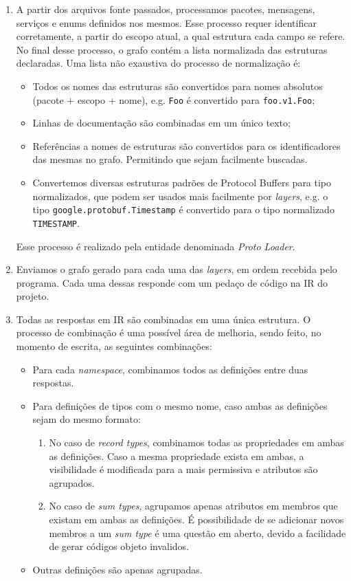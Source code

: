 \begin{enumerate}
\item A partir dos arquivos fonte passados, processamos pacotes, mensagens, serviços e enums
  definidos nos mesmos. Esse processo requer identificar corretamente, a partir do escopo atual,
  a qual estrutura cada campo se refere. No final desse processo, o grafo contém a lista
  normalizada das estruturas declaradas. Uma lista não exaustiva do processo de normalização é:

  \begin{itemize}
  \item Todos os nomes das estruturas são convertidos para nomes absolutos (pacote + escopo + nome),
    e.g. \texttt{Foo} é convertido para \texttt{foo.v1.Foo};
  \item Linhas de documentação são combinadas em um único texto;
  \item Referências a nomes de estruturas são convertidos para os identificadores das mesmas no
    grafo. Permitindo que sejam facilmente buscadas.
  \item Convertemos diversas estruturas padrões de Protocol Buffers para tipo normalizados, que
    podem ser usados mais facilmente por \textit{layers}, e.g. o tipo \texttt{google.protobuf.Timestamp}
    é convertido para o tipo normalizado \texttt{TIMESTAMP}.
  \end{itemize}

  Esse processo é realizado pela entidade denominada \textit{Proto Loader}.
\item Enviamos o grafo gerado para cada uma das \textit{layers}, em ordem recebida pelo programa.
  Cada uma dessas responde com um pedaço de código na IR do projeto.
\item Todas as respostas em IR são combinadas em uma única estrutura. O processo de combinação é
  uma possível área de melhoria, sendo feito, no momento de escrita, as seguintes combinações:

  \begin{itemize}
  \item Para cada \textit{namespace}, combinamos todos as definições entre duas respostas.
  \item Para definições de tipos com o mesmo nome, caso ambas as definições sejam do mesmo formato:
    \begin{enumerate}
    \item No caso de \textit{record types}, combinamos todas as propriedades em ambas as definições.
      Caso a mesma propriedade exista em ambas, a visibilidade é modificada para a mais permissiva e
      atributos são agrupados.
    \item No caso de \textit{sum types}, agrupamos apenas atributos em membros que existam em ambas
      as definições. É possibilidade de se adicionar novos membros a um \textit{sum type} é uma questão
      em aberto, devido a facilidade de gerar códigos objeto invalidos.
    \end{enumerate}
  \item Outras definições são apenas agrupadas.
  \end{itemize}


\end{enumerate}
